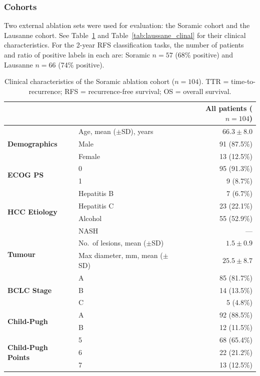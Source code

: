 \documentclass[12pt,twoside]{report}
\begin{document}
\subsubsection*{Cohorts}
Two external ablation sets were used for evaluation: the Soramic cohort and the Lausanne cohort. 
See Table~\ref{tab:soramic_clinal} and  Table~\ref{tab:laussane_clinal} for their clinical characteristics. 
For the 2-year RFS classification tasks, the number of patients and ratio of positive labels in each are:
Soramic $n=57$ (68\% positive) and Lausanne $n=66$ (74\% positive).


\begin{table}[H]
\centering
\small
\caption{Clinical characteristics of the Soramic ablation cohort ($n=104$).
TTR = time-to-recurrence; RFS = recurrence-free survival; OS = overall survival.}
\label{tab:soramic_clinal}
\begin{tabular}{p{3.8cm}lr}
\hline
 & & All patients ($n=104$) \\
\hline
\multirow{3}{*}{\textbf{Demographics}}
  & Age, mean ($\pm$SD), years & $66.3 \pm 8.0$ \\
  & Male & 91 (87.5\%) \\
  & Female & 13 (12.5\%) \\
\hline
\multirow{2}{*}{\textbf{ECOG PS}}
  & 0 & 95 (91.3\%) \\
  & 1 & 9 (8.7\%) \\
\hline
\multirow{4}{*}{\textbf{HCC Etiology}}
  & Hepatitis B & 7 (6.7\%) \\
  & Hepatitis C & 23 (22.1\%) \\
  & Alcohol & 55 (52.9\%) \\
  & NASH & --- \\
\hline
\multirow{2}{*}{\textbf{Tumour}}
  & No.\ of lesions, mean ($\pm$SD) & $1.5 \pm 0.9$ \\
  & Max diameter, mm, mean ($\pm$SD) & $25.5 \pm 8.7$ \\
\hline
\multirow{3}{*}{\textbf{BCLC Stage}}
  & A & 85 (81.7\%) \\
  & B & 14 (13.5\%) \\
  & C & 5 (4.8\%) \\
\hline
\multirow{2}{*}{\textbf{Child-Pugh}}
  & A & 92 (88.5\%) \\
  & B & 12 (11.5\%) \\
\hline
\multirow{4}{*}{\textbf{Child-Pugh Points}}
  & 5 & 68 (65.4\%) \\
  & 6 & 22 (21.2\%) \\
  & 7 & 13 (12.5\%) \\

\end{tabular}
\end{table}
\end{document}
